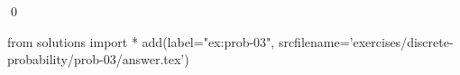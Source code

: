 
\begin{ex} 
  \label{ex:prob-03}
  
  \qed
\end{ex} 
\begin{python0}
from solutions import *
add(label="ex:prob-03",
    srcfilename='exercises/discrete-probability/prob-03/answer.tex') 
\end{python0}
